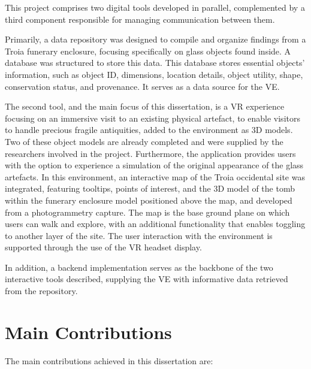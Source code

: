 This project comprises two digital tools developed in parallel, complemented by a third component responsible for managing communication between them.

Primarily, a data repository was designed to compile and organize findings from a Troia funerary enclosure, focusing specifically on glass objects found inside. A database was structured to store this data. 
This database stores essential objects' information, such as object ID, dimensions, location details, object utility, shape, 
conservation status, and provenance. It serves as a data source for the \gls{VE}.

The second tool, and the main focus of this dissertation, is a \gls{VR} experience focusing on an immersive visit to an existing physical 
artefact, to enable visitors to handle precious fragile antiquities, added to the environment as \gls{3D} models. 
Two of these object models are already completed and were supplied by the researchers involved in the project.
Furthermore, the application provides users with the option to experience a simulation of the original appearance of the glass artefacts.
In this environment, an interactive map of the Troia occidental site was integrated, featuring tooltips, points of interest, and the \gls{3D} model of the tomb within the funerary enclosure model positioned above the map, and developed from a photogrammetry capture. 
The map is the base ground plane on which users can walk and explore, with an additional functionality that enables toggling to another layer of the site.
The user interaction with the environment is supported through the use of the \gls{VR} headset display.

In addition, a backend implementation serves as the backbone of the two interactive tools described, supplying the \gls{VE} with informative data retrieved from the repository.

\section{Main Contributions}
\label{sec:contributions}

The main contributions achieved in this dissertation are:

